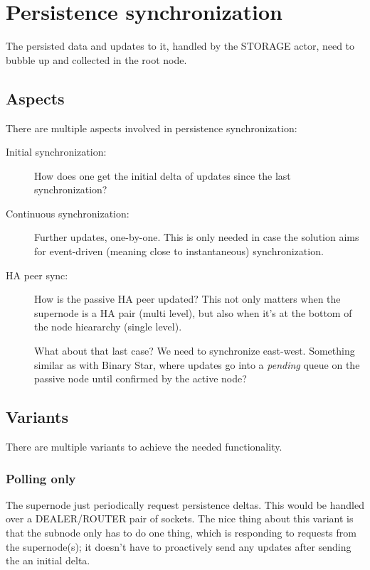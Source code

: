 \section{Persistence synchronization}\label{sec:approach:psync}
The persisted data and updates to it, handled by the STORAGE actor, need to
bubble up and collected in the root node.

\subsection{Aspects}
There are multiple aspects involved in persistence synchronization:

\begin{description}
	\item [Initial synchronization:]
		How does one get the initial delta of updates since the last
		synchronization?

	\item [Continuous synchronization:]
		Further updates, one-by-one. This is only needed in
		case the solution aims for event-driven (meaning close to
		instantaneous) synchronization.

	\item [HA peer sync:]
		How is the passive HA peer updated?
		This not only matters when the supernode is a HA pair (multi
		level), but also when it's at the bottom of the node hieararchy
		(single level).

		\large\color{red} What about that last case? We need to synchronize
		east-west. Something similar as with Binary Star, where updates
		go into a \emph{pending} queue on the passive node until
		confirmed by the active node?
\end{description}


\subsection{Variants}
There are multiple variants to achieve the needed functionality.

\subsubsection{Polling only}
The supernode just periodically request persistence
deltas. This would be handled over a DEALER/ROUTER pair of sockets. The nice
thing about this variant is that the subnode only has to do one thing, which is
responding to requests from the supernode(s); it doesn't have to proactively
send any updates after sending the an initial delta.

